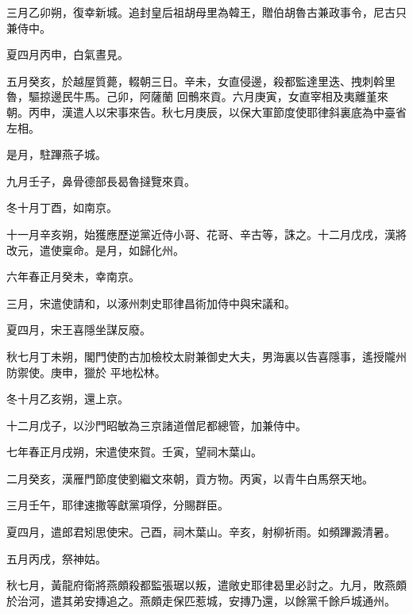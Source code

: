 \begin{pinyinscope}
 三月乙卯朔，復幸新城。追封皇后祖胡母里為韓王，贈伯胡魯古兼政事令，尼古只兼侍中。



 夏四月丙申，白氣晝見。



 五月癸亥，於越屋質薨，輟朝三日。辛未，女直侵邊，殺都監達里迭、拽刺斡里魯，驅掠邊民牛馬。己卯，阿薩蘭
 回鶻來貢。六月庚寅，女直宰相及夷離堇來朝。丙申，漢遣人以宋事來告。秋七月庚辰，以保大軍節度使耶律斜裏底為中臺省左相。



 是月，駐蹕燕子城。



 九月壬子，鼻骨德部長曷魯撻覽來貢。



 冬十月丁酉，如南京。



 十一月辛亥朔，始獲應歷逆黨近侍小哥、花哥、辛古等，誅之。十二月戊戌，漢將改元，遣使稟命。是月，如歸化州。



 六年春正月癸未，幸南京。



 三月，宋遣使請和，以涿州刺史耶律昌術加侍中與宋議和。



 夏四月，宋王喜隱坐謀反廢。



 秋七月丁未朔，閣門使酌古加檢校太尉兼御史大夫，男海裏以告喜隱事，遙授隴州防禦使。庚申，獵於
 平地松林。



 冬十月乙亥朔，還上京。



 十二月戊子，以沙門昭敏為三京諸道僧尼都總管，加兼侍中。



 七年春正月戌朔，宋遣使來賀。壬寅，望祠木葉山。



 二月癸亥，漢雁門節度使劉繼文來朝，貢方物。丙寅，以青牛白馬祭天地。



 三月壬午，耶律速撒等獻黨項俘，分賜群臣。



 夏四月，遣郎君矧思使宋。己酉，祠木葉山。辛亥，射柳祈雨。如頻蹕澱清暑。



 五月丙戌，祭神姑。



 秋七月，黃龍府衛將燕頗殺都監張琚以叛，遣敞史耶律曷里必討之。九月，敗燕頗於治河，遣其弟安摶追之。燕頗走保匹惹城，安摶乃還，以餘黨千餘戶城通州。




\end{pinyinscope}
